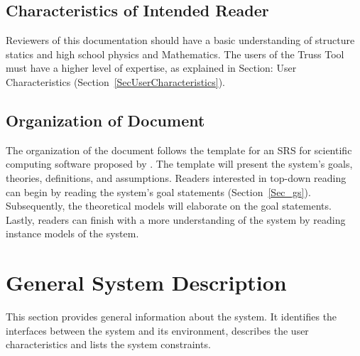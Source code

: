 \documentclass[12pt]{article}
\begin{document}
\subsection{Characteristics of Intended Reader} \label{sec_IntendedReader}
Reviewers of this documentation should have a basic understanding of structure statics and high school physics and Mathematics. The users of the Truss Tool must have a higher level of expertise, as explained in Section: User Characteristics (Section~\ref{SecUserCharacteristics}). 

\subsection{Organization of Document}
The organization of the document follows the template for an SRS for scientific computing software proposed by \citet{SmithandLai2005}. The template will present the system's goals, theories, definitions, and assumptions. Readers interested in top-down reading can begin by reading the system's goal statements (Section~\ref{Sec_gs}). Subsequently, the theoretical models will elaborate on the goal statements. Lastly, readers can finish with a more  understanding of the system by reading instance models of the system.

\section{General System Description}

This section provides general information about the system.  It identifies the interfaces between the system and its environment, describes the user characteristics and lists the system constraints.  %

\end{document}
